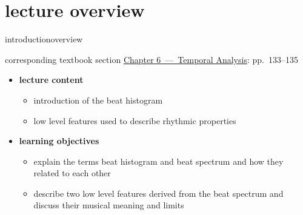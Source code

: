 




\subtitle{Module 6.4: Rhythm Descriptors}


	

    \section[overview]{lecture overview}
        \begin{frame}{introduction}{overview}
            \begin{block}{corresponding textbook section}
                    \href{http://ieeexplore.ieee.org/xpl/articleDetails.jsp?arnumber=6331123}{Chapter 6~---~Temporal Analysis}: pp.~133--135
            \end{block}

            \begin{itemize}
                \item   \textbf{lecture content}
                    \begin{itemize}
                        \item   introduction of the beat histogram
                        \item   low level features used to describe rhythmic properties
                    \end{itemize}
                \bigskip
                \item<2->   \textbf{learning objectives}
                    \begin{itemize}
                        \item   explain the terms beat histogram and beat spectrum and how they related to each other
                        \item   describe two low level features derived from the beat spectrum and discuss their musical meaning and limits
                    \end{itemize}
            \end{itemize}
        \end{frame}

